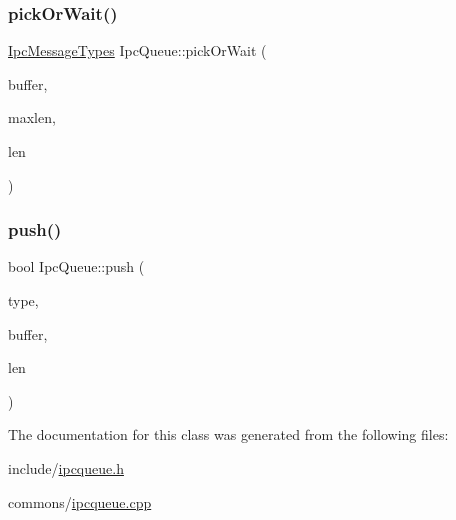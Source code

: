 \subsubsection{\texorpdfstring{pickOrWait()}{pickOrWait()}}
{\footnotesize\ttfamily \mbox{\hyperlink{ipcmsgtypes_8h_a59f75a61492e64aebfae0cc49cc26683}{Ipc\+Message\+Types}} Ipc\+Queue\+::pick\+Or\+Wait (\begin{DoxyParamCaption}\item[{void $\ast$}]{buffer,  }\item[{size\+\_\+t}]{maxlen,  }\item[{size\+\_\+t $\ast$}]{len }\end{DoxyParamCaption})}

\mbox{\label{class_ipc_queue_ac701db4e58a21577025bfd6890196d0f}} 
\subsubsection{\texorpdfstring{push()}{push()}}
{\footnotesize\ttfamily bool Ipc\+Queue\+::push (\begin{DoxyParamCaption}\item[{\mbox{\hyperlink{ipcmsgtypes_8h_a59f75a61492e64aebfae0cc49cc26683}{Ipc\+Message\+Types}}}]{type,  }\item[{void $\ast$}]{buffer,  }\item[{size\+\_\+t}]{len }\end{DoxyParamCaption})}



The documentation for this class was generated from the following files\+:\begin{DoxyCompactItemize}
\item 
include/\mbox{\hyperlink{ipcqueue_8h}{ipcqueue.\+h}}\item 
commons/\mbox{\hyperlink{ipcqueue_8cpp}{ipcqueue.\+cpp}}\end{DoxyCompactItemize}

